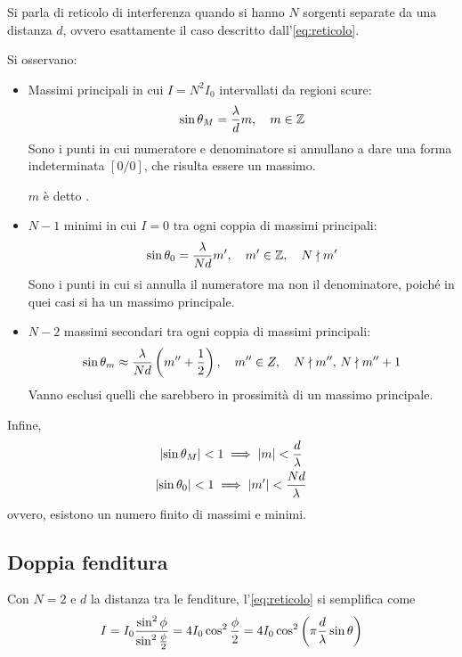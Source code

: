 Si parla di reticolo di interferenza quando si hanno $N$ sorgenti separate da una distanza $d$, ovvero esattamente il caso descritto dall'\cref{eq:reticolo}.

Si osservano:
\begin{itemize}
    \item Massimi principali in cui $I = N^2 I_0$ intervallati da regioni scure:
        \begin{equation}
            \sin\theta_M = \frac{\lambda}{d} m, \quad m \in \mathbb{Z}
        \end{equation}
        Sono i punti in cui numeratore e denominatore si annullano a dare una forma indeterminata $[0/0]$, che risulta essere un massimo.

        $m$ è detto .
    \item $N - 1$ minimi in cui $I = 0$ tra ogni coppia di massimi principali:
        \begin{equation}
            \sin\theta_0 = \frac{\lambda}{N d} m', \quad
            m' \in \mathbb{Z}, \quad
            N \nmid m'
        \end{equation}
        Sono i punti in cui si annulla il numeratore ma non il denominatore, poiché in quei casi si ha un massimo principale.
    \item $N - 2$ massimi secondari tra ogni coppia di massimi principali:
        \begin{equation}
            \sin\theta_m \approx \frac{\lambda}{N d} \left( m'' + \frac{1}{2} \right), \quad
            m'' \in Z, \quad
            N \nmid m'', \, N \nmid m''+1
        \end{equation}
        Vanno esclusi quelli che sarebbero in prossimità di un massimo principale.
\end{itemize}

Infine,
\begin{gather}
    \left\lvert \sin\theta_M \right\rvert < 1 \implies \left\lvert m \right\rvert < \frac{d}{\lambda} \\
    \left\lvert \sin\theta_0 \right\rvert < 1 \implies \left\lvert m' \right\rvert < \frac{N d}{\lambda}
\end{gather}
ovvero, esistono un numero finito di massimi e minimi.


\subsection{Doppia fenditura}
\label{sec:doubleslit}

Con $N = 2$ e $d$ la distanza tra le fenditure, l'\cref{eq:reticolo} si semplifica come
\begin{equation}
    I = I_0 \frac{\sin^2 \phi}{\sin^2 \frac{\phi}{2}}
    = 4 I_0 \cos^2 \frac{\phi}{2}
    = 4 I_0 \cos^2 \left( \pi \frac{d}{\lambda} \sin\theta \right)
\end{equation}

